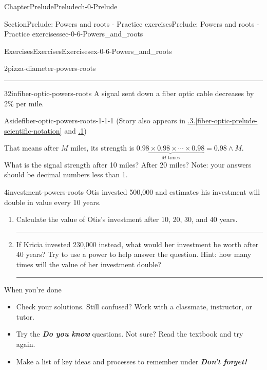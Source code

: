 \documentclass[twoside,11pt,]{book}
\newcommand{\xreffont}{\relax}
\newcommand{\alert}[1]{\textbf{\textit{#1}}}
\newlength{\workspacestrutwidth}
\numberwithin{equation}{section}
\begin{document}
\begin{chapterptx}{Chapter}{Prelude}{}{Prelude}{}{}{ch-0-Prelude}
\begin{sectionptx}{Section}{Prelude: Powers and roots - Practice exercises}{}{Prelude: Powers and roots - Practice exercises}{}{}{sec-0-6-Powers_and_roots}
\begin{exercises-subsection-numberless}{Exercises}{Exercises}{}{Exercises}{}{}{ex-0-6-Powers_and_roots}
\begin{divisionexercise}{2}{}{}{pizza-diameter-powers-roots}
\begin{enumerate}[label=(\alph*),ref=\alph*]
\par\rule{\workspacestrutwidth}{0in}%
\end{enumerate}%
\end{divisionexercise}%
\clearpage
\begin{divisionexercise}{3}{}{2in}{fiber-optic-powers-roots}%
A signal sent down a fiber optic cable decreases by 2\% per mile. \begin{aside}{Aside}{}{fiber-optic-powers-roots-1-1-1}%
(Story also appears in \hyperref[fiber-optic-prelude-scientific-notation]{{\xreffont 0.8.3}.{\xreffont\ref{fiber-optic-prelude-scientific-notation}}} and \hyperlink{fiber-optic-growth-decay}{{\xreffont 5.2.1}})%
\end{aside}
 That means after \(M\) miles, its strength is \(\underbrace{0.98 \times 0.98 \times \cdots \times 0.98}_{M \text{ times}} = 0.98 \wedge M\). What is the signal strength after 10 miles? After 20 miles? Note: your answers should be decimal numbers less than 1.%
\end{divisionexercise}%
 \begin{divisionexercise}{4}{}{}{investment-powers-roots}%
Otis invested \textdollar{}500,000 and estimates his investment will double in value every 10 years.%
\begin{enumerate}[label=(\alph*),ref=\alph*]%
\item{}Calculate the value of Otis's investment after 10, 20, 30, and 40 years.%
\par\rule{\workspacestrutwidth}{2in}%
\item{}If Kricia invested \textdollar{}230,000 instead, what would her investment be worth after 40 years? Try to use a power to help answer the question. Hint: how many times will the value of her investment double?%
\par\rule{\workspacestrutwidth}{2in}%
\end{enumerate}%
\end{divisionexercise}%
\end{exercises-subsection-numberless}
\begin{conclusion}{When you're done \textellipsis{}}%
%
\begin{itemize}[label=\textbullet]
\item{}Check your solutions. Still confused? Work with a classmate, instructor, or tutor.%
\item{}Try the \alert{Do you know} questions. Not sure? Read the textbook and try again.%
\item{}Make a list of key ideas and processes to remember under \alert{Don't forget!}%

\end{itemize}
\end{conclusion}
\end{sectionptx}
\end{chapterptx}
\end{document}
